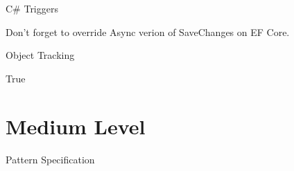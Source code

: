 \documentclass{bredelebeamer}
\begin{document}
\begin{frame}{C\# Triggers}
    
    \pause
    Don't forget to override Async verion of SaveChanges on EF Core.
\end{frame}
\begin{frame}{Object Tracking}
    

    \pause
    \begin{exampleblock}{}
        True
    \end{exampleblock}
\end{frame}

\section{Medium Level}
\begin{frame}{Pattern Specification}
    
\end{frame}
\end{document}
